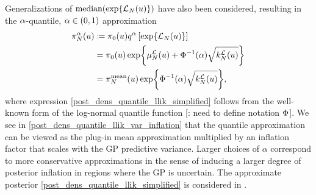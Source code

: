 \documentclass[12pt]{article}
\begin{document}
Generalizations of $\text{median}(\Exp{\llikEm[\Ndesign](\Par)})$ have also been considered, resulting 
in the $\quantileProb$-quantile, $\quantileProb \in (0,1)$ approximation
\begin{align}
\llikEmQDens[\Ndesign](\Par) 
&\Def \priorDens(\Par) \quantile \left[\Exp{\llikEm[\Ndesign](\Par)} \right] \label{post_dens_quantile_llik} \\
&= \priorDens(\Par) \Exp{\emMean[\Ndesign]{\llik}(\Par) + \GaussianCDF^{-1}(\quantileProb) \sqrt{\emKer[\Ndesign]{\llik}(\Par)}} 
\label{post_dens_quantile_llik_simplified} \\
&= \llikEmMeanDens[\Ndesign](\Par) \Exp{\GaussianCDF^{-1}(\quantileProb) \sqrt{\emKer[\Ndesign]{\llik}(\Par)}},
\label{post_dens_quantile_llik_var_inflation}
\end{align}
where expression \ref{post_dens_quantile_llik_simplified} follows from the well-known form of the log-normal 
quantile function [\todo: need to define notation $\GaussianCDF$]. 
We see in \ref{post_dens_quantile_llik_var_inflation} that the quantile approximation can 
be viewed as the plug-in mean approximation multiplied by an inflation factor that scales with the GP predictive 
variance. Larger choices of $\alpha$ correspond to more conservative approximations in the sense of inducing 
a larger degree of posterior inflation in regions where the GP is uncertain. The approximate posterior 
\ref{post_dens_quantile_llik_simplified} is considered in \citep{VehtariParallelGP, quantileApprox}.
\end{document}
